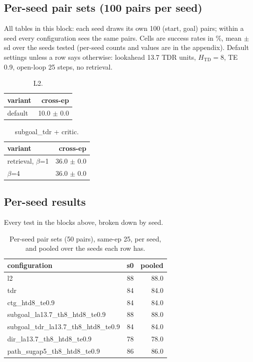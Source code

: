 \subsection*{Per-seed pair sets (100 pairs per seed)}
All tables in this block: each seed draws its own 100 (start, goal) pairs; within a seed every configuration sees the same pairs. Cells are success rates in \%, mean $\pm$ sd over the seeds tested (per-seed counts and values are in the appendix). Default settings unless a row says otherwise: lookahead 13.7 TDR units, $H_{\mathrm{TD}}=8$, TE 0.9, open-loop 25 steps, no retrieval.

\begin{table}[H]
\centering\small
\caption{L2.}
\label{tab:gas-mpc-l2-perseed-n100}
\begin{tabular}{lr}
\toprule
variant & cross-ep \\
\midrule
default & 10.0 $\pm$ 0.0 \\
\bottomrule
\end{tabular}
\end{table}

\begin{table}[H]
\centering\small
\caption{subgoal\_tdr + critic.}
\label{tab:gas-mpc-subgoal_tdr-crit-perseed-n100}
\begin{tabular}{lr}
\toprule
variant & cross-ep \\
\midrule
retrieval, $\beta$=1 & 36.0 $\pm$ 0.0 \\
$\beta$=4 & 36.0 $\pm$ 0.0 \\
\bottomrule
\end{tabular}
\end{table}

\clearpage
\subsection*{Per-seed results}
Every test in the blocks above, broken down by seed.

\begin{table}[H]
\centering\small
\caption{Per-seed pair sets (50 pairs), same-ep 25, per seed, and pooled over the seeds each row has.}
\label{tab:gas-mpc-pooled-same25-perseed-n50}
\begin{tabular}{lrr}
\toprule
configuration & s0 & pooled \\
\midrule
l2 & 88 & 88.0 \\
tdr & 84 & 84.0 \\
ctg\_htd8\_te0.9 & 84 & 84.0 \\
subgoal\_la13.7\_th8\_htd8\_te0.9 & 88 & 88.0 \\
subgoal\_tdr\_la13.7\_th8\_htd8\_te0.9 & 84 & 84.0 \\
dir\_la13.7\_th8\_htd8\_te0.9 & 78 & 78.0 \\
path\_sugap5\_th8\_htd8\_te0.9 & 86 & 86.0 \\
\bottomrule
\end{tabular}
\end{table}

